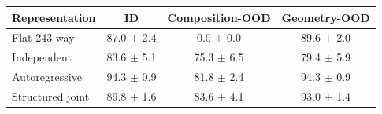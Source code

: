 \begin{tabular}{lccc}
\toprule
Representation & ID & Composition-OOD & Geometry-OOD \\
\midrule
Flat 243-way & 87.0 $\pm$ 2.4 & 0.0 $\pm$ 0.0 & 89.6 $\pm$ 2.0 \\
Independent & 83.6 $\pm$ 5.1 & 75.3 $\pm$ 6.5 & 79.4 $\pm$ 5.9 \\
Autoregressive & 94.3 $\pm$ 0.9 & 81.8 $\pm$ 2.4 & 94.3 $\pm$ 0.9 \\
Structured joint & 89.8 $\pm$ 1.6 & 83.6 $\pm$ 4.1 & 93.0 $\pm$ 1.4 \\
\bottomrule
\end{tabular}
